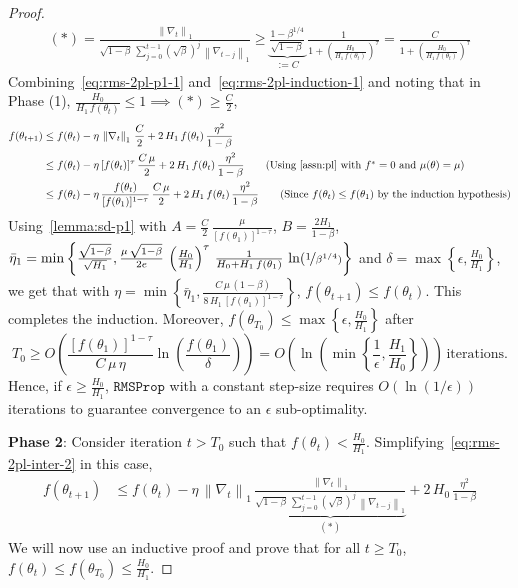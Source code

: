 \documentclass{article}
\newcommand{\norm}[1]{\left\|#1 \right\|}
\newcommand{\tht}{\theta_t}
\newcommand{\thtt}{\theta_{t+1}}
\newcommand{\RMS}{\texttt{RMSProp}}
\begin{document}
\begin{proof}
\begin{align}
(*) = \frac{\norm{\nabla_t}_1}{\sqrt{1 - \beta} \, \sum_{j = 0}^{t-1} (\sqrt{\beta})^{j} \, \norm{\nabla_{t-j}}_1} \geq \underbrace{\frac{1 - \beta^{1/4}}{\sqrt{1 - \beta}}}_{:= C} \, \frac{1}{1 + \left( \frac{H_0}{H_1 \, f(\tht)} \right)^{\tau} }  = \frac{C}{1 + \left( \frac{H_0}{H_1 \, f(\tht)} \right)^{\tau} }  \label{eq:rms-2pl-induction-1}
\end{align}
Combining~\cref{eq:rms-2pl-p1-1} and~\cref{eq:rms-2pl-induction-1} and noting that in Phase (1), $\frac{H_0}{H_1 \, f(\tht)} \leq 1 \implies (*) \geq \frac{C}{2}$,
\begin{align*}
f(\thtt) & \leq f(\tht) - \eta \, \norm{\nabla_t}_1 \, \frac{C}{2} + 2 \, H_1 \, f(\tht)  \, \frac{\eta^2}{1 - \beta} \\
& \leq f(\tht) - \eta \, [f(\tht)]^\tau \, \frac{C \, \mu}{2} + 2 \, H_1 \, f(\tht)  \, \frac{\eta^2}{1 - \beta} 
\tag{Using~\cref{assn:pl} with $f^* = 0$ and $\mu(\theta) = \mu$} \\
& \leq f(\tht) - \eta \, \frac{f(\tht)}{[f(\theta_1)]^{1-\tau}} \, \frac{C \, \mu}{2} + 2 \, H_1 \, f(\tht)  \, \frac{\eta^2}{1 - \beta} \tag{Since $f(\tht) \leq f(\theta_1)$ by the induction hypothesis}
\end{align*}
Using~\cref{lemma:sd-p1} with $A = \frac{C}{2} \, \frac{\mu}{[f(\theta_1)]^{1 - \tau}}$, $B = \frac{2 H_1}{1 - \beta}$, $\bar{\eta}_1 = \min\left\{\frac{\sqrt{1-\beta}}{\sqrt{H_1}}, \frac{\mu \, \sqrt{1 - \beta}}{2 e} \, \left(\frac{H_0}{H_1}\right)^\tau \, \frac{1}{H_0 + H_1 \, f(\theta_1)} \, \ln(\nicefrac{1}{\beta^{1/4})}\right\}$ and $\delta = \max\left\{\epsilon, \frac{H_0}{H_1} \right\}$, we get that with $\eta = \min\left\{\bar{\eta}_1, \frac{C \, \mu \, (1 - \beta)}{8 \, H_1 \, [f(\theta_1)]^{1 - \tau}} \right\}$, $f(\thtt) \leq f(\tht)$. This completes the induction. Moreover, $f(\theta_{T_0}) \leq \max\left\{\epsilon, \frac{H_0}{H_1} \right\}$ after 
\[
T_0 \geq O \left(\frac{[f(\theta_1)]^{1 - \tau}}{C \, \mu \, \eta} \ln\left(\frac{f(\theta_1)}{\delta}\right) \right) = O \left(\ln\left(\min\left\{\frac{1}{\epsilon}, \frac{H_1}{H_0} \right\} \right) \right)\, \text{iterations.}
\]
Hence, if $\epsilon \geq \frac{H_0}{H_1}$, $\RMS$ with a constant step-size requires $O(\ln(1/\epsilon))$ iterations to guarantee convergence to an $\epsilon$ sub-optimality. 



\textbf{Phase 2}: Consider iteration $t > T_0$ such that $f(\tht) < \frac{H_0}{H_1}$. Simplifying~\cref{eq:rms-2pl-inter-2} in this case, 
\begin{align}
f(\thtt) & \leq f(\tht) - \eta \, \norm{\nabla_t}_1 \, \underbrace{\frac{\norm{\nabla_t}_1}{\sqrt{1 - \beta} \, \sum_{j = 0}^{t-1} (\sqrt{\beta})^{j} \, \norm{\nabla_{t-j}}_1}}_{(*)} + 2 \, H_0  \, \frac{\eta^2}{1 - \beta}    \label{eq:rms-2pl-p1-2}
\end{align}
We will now use an inductive proof and prove that for all $t \geq T_0$, $f(\tht) \leq f(\theta_{T_0}) \leq \frac{H_0}{H_1}$.



\end{proof}
\end{document}
